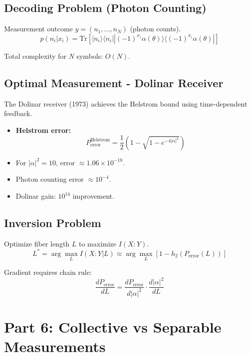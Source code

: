 \documentclass[11pt,a4paper]{article}
\begin{document}
\subsection{Decoding Problem (Photon Counting)}

Measurement outcome $y = (n_1, \ldots, n_N)$ (photon counts).
\begin{equation}
p(n_i|x_i) = \text{Tr}\left[|n_i\rangle\langle n_i| |(-1)^{x_i}\alpha(\theta)\rangle\langle(-1)^{x_i}\alpha(\theta)|\right]
\end{equation}

Total complexity for $N$ symbols: $O(N)$.

\subsection{Optimal Measurement - Dolinar Receiver}

The Dolinar receiver (1973) achieves the Helstrom bound using time-dependent feedback.

\begin{itemize}
    \item \textbf{Helstrom error:} 
    \begin{equation}
    P_{\text{error}}^{\text{Helstrom}} = \frac{1}{2}\left(1 - \sqrt{1 - e^{-4|\alpha|^2}}\right)
    \end{equation}
    \item For $|\alpha|^2 = 10$, error $\approx 1.06 \times 10^{-18}$.
    \item Photon counting error $\approx 10^{-4}$.
    \item Dolinar gain: $10^{14}$ improvement.
\end{itemize}

\subsection{Inversion Problem}

Optimize fiber length $L$ to maximize $I(X : Y)$.
\begin{equation}
L^* = \arg\max_L I(X : Y|L) \approx \arg\max_L [1 - h_2(P_{\text{error}}(L))]
\end{equation}

Gradient requires chain rule: 
\begin{equation}
\frac{dP_{\text{error}}}{dL} = \frac{dP_{\text{error}}}{d|\alpha|^2} \cdot \frac{d|\alpha|^2}{dL}
\end{equation}

\section{Part 6: Collective vs Separable Measurements}
\end{document}
